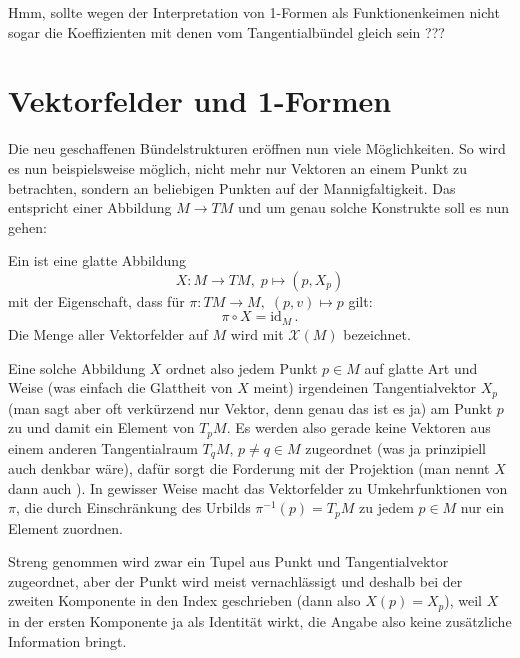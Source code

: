 \documentclass[../H_Analysis_main.tex]{subfiles}
\begin{document}
Hmm, sollte wegen der Interpretation von 1-Formen als Funktionenkeimen nicht sogar die Koeffizienten mit denen vom Tangentialbündel gleich sein ???




\newpage


	\section{Vektorfelder und 1-Formen}
Die neu geschaffenen Bündelstrukturen eröffnen nun viele Möglichkeiten. So wird es nun beispielsweise möglich, nicht mehr nur Vektoren an einem Punkt zu betrachten, sondern an beliebigen Punkten auf der Mannigfaltigkeit. Das entspricht einer Abbildung $M \rightarrow TM$ und um genau solche Konstrukte soll es nun gehen:
\begin{defi}
Ein  ist eine glatte Abbildung
\begin{equation}
X: M \rightarrow TM, \; p \mapsto (p, X_p)
\end{equation}
mit der Eigenschaft, dass für $\pi: TM \rightarrow M, \; (p, v) \mapsto p$ gilt:
\begin{equation}
\pi \circ X = \text{id}_M \, .
\end{equation}
Die Menge aller Vektorfelder auf $M$ wird mit $\mathcal{X}(M)$ bezeichnet.
\end{defi}
Eine solche Abbildung $X$ ordnet also jedem Punkt $p \in M$ auf glatte Art und Weise (was einfach die Glattheit von $X$ meint) irgendeinen Tangentialvektor $X_p$ (man sagt aber oft verkürzend nur Vektor, denn genau das ist es ja) am Punkt $p$ zu und damit ein Element von $T_p M$. Es werden also gerade keine Vektoren aus einem anderen Tangentialraum $T_q M, \, p \neq q \in M$ zugeordnet (was ja prinzipiell auch denkbar wäre), dafür sorgt die Forderung mit der Projektion (man nennt $X$ dann auch ). In gewisser Weise macht das Vektorfelder zu Umkehrfunktionen von $\pi$, die durch Einschränkung des Urbilds $\pi^{-1}(p) = T_p M$ zu jedem $p \in M$ nur ein Element zuordnen.


Streng genommen wird zwar ein Tupel aus Punkt und Tangentialvektor zugeordnet, aber der Punkt wird meist vernachlässigt und deshalb bei der zweiten Komponente in den Index geschrieben (dann also $X(p) = X_p$), weil $X$ in der ersten Komponente ja als Identität wirkt, die Angabe also keine zusätzliche Information bringt.
\end{document}
